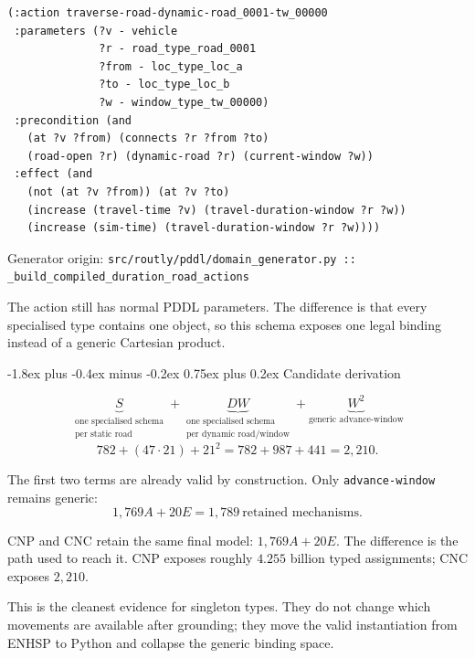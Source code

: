 \documentclass[11pt,a4paper]{article}
\makeatletter
\renewcommand{\subsection}{\@startsection{subsection}{2}{0pt}
  {-1.8ex plus -0.4ex minus -0.2ex}
  {0.75ex plus 0.2ex}
  {\normalfont\large\bfseries\color{RoutlyNavy}}}
\newcommand{\codeorigin}[1]{%
  {\footnotesize\textcolor{RoutlyMuted}{Generator origin: \texttt{#1}}\par}
}
\makeatother
\begin{document}
\begin{lstlisting}
(:action traverse-road-dynamic-road_0001-tw_00000
 :parameters (?v - vehicle
              ?r - road_type_road_0001
              ?from - loc_type_loc_a
              ?to - loc_type_loc_b
              ?w - window_type_tw_00000)
 :precondition (and
   (at ?v ?from) (connects ?r ?from ?to)
   (road-open ?r) (dynamic-road ?r) (current-window ?w))
 :effect (and
   (not (at ?v ?from)) (at ?v ?to)
   (increase (travel-time ?v) (travel-duration-window ?r ?w))
   (increase (sim-time) (travel-duration-window ?r ?w))))
\end{lstlisting}
\codeorigin{src/routly/pddl/domain\_generator.py :: \_build\_compiled\_duration\_road\_actions}

The action still has normal PDDL parameters. The difference is that every
specialised type contains one object, so this schema exposes one legal binding
instead of a generic Cartesian product.

\subsection{Candidate derivation}

\[
\underbrace{S}_{\substack{\text{one specialised schema}\\\text{per static road}}}
+
\underbrace{DW}_{\substack{\text{one specialised schema}\\
\text{per dynamic road/window}}}
+
\underbrace{W^2}_{\text{generic advance-window}}
\]
\[
782+(47\cdot21)+21^2
=782+987+441
=\boxed{2{,}210}.
\]

The first two terms are already valid by construction. Only
\texttt{advance-window} remains generic:
\[
\boxed{1{,}769A+20E=1{,}789\ \text{retained mechanisms}.}
\]

\begin{keybox}
CNP and CNC retain the same final model: \(1{,}769A+20E\). The difference is
the path used to reach it. CNP exposes roughly \(4.255\) billion typed
assignments; CNC exposes \(2{,}210\).
\end{keybox}

\begin{defencebox}
This is the cleanest evidence for singleton types. They do not change which
movements are available after grounding; they move the valid instantiation
from ENHSP to Python and collapse the generic binding space.
\end{defencebox}

\end{document}
